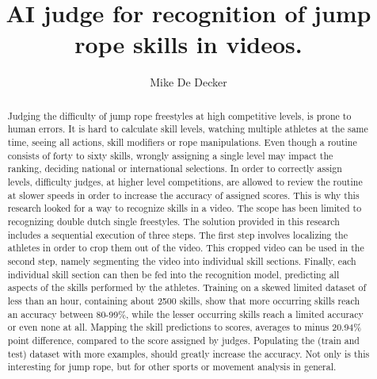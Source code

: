 \documentclass[english,a0,portrait]{hogent-poster}
\title{AI judge for recognition of jump rope skills in videos.}
\author{Mike De Decker}
\begin{document}
\maketitle

\begin{abstract}
Judging the difficulty of jump rope freestyles at high competitive levels, is prone to human errors. It is hard to calculate skill levels, watching multiple athletes at the same time, seeing all actions, skill modifiers or rope manipulations.
Even though a routine consists of forty to sixty skills, wrongly assigning a single level may impact the ranking, deciding national or international selections. In order to correctly assign levels, difficulty judges, at higher level competitions, are allowed to review the routine at slower speeds in order to increase the accuracy of assigned scores.
This is why this research looked for a way to recognize skills in a video. The scope has been limited to recognizing double dutch single freestyles. The solution provided in this research includes a sequential execution of three steps. The first step involves localizing the athletes in order to crop them out of the video. This cropped video can be used in the second step, namely segmenting the video into individual skill sections. Finally, each individual skill section can then be fed into the recognition model, predicting all aspects of the skills performed by the athletes. Training on a skewed limited dataset of less than an hour, containing about 2500 skills, show that more occurring skills reach an accuracy between 80-99\%, while the lesser occurring skills reach a limited accuracy or even none at all. Mapping the skill predictions to scores, averages to minus 20.94\% point difference, compared to the score assigned by judges. Populating the (train and test) dataset with more examples, should greatly increase the accuracy. Not only is this interesting for jump rope, but for other sports or movement analysis in general.

\end{abstract}
\end{document}
